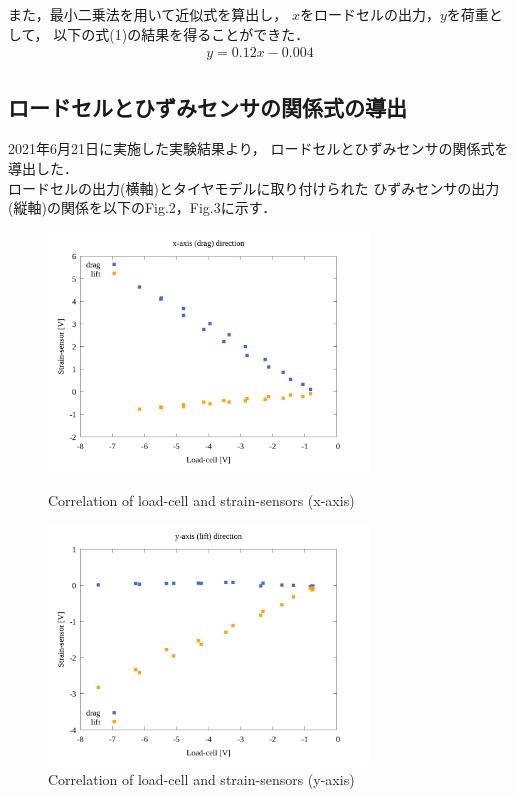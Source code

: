 \documentclass[twocolumn,a4j]{jsarticle}
\begin{document}
また，最小二乗法を用いて近似式を算出し，
$x$をロードセルの出力，$y$を荷重として，
以下の式(1)の結果を得ることができた．
\begin{eqnarray}
    y = 0.12 x - 0.004
\end{eqnarray}

\subsection{ロードセルとひずみセンサの関係式の導出}
2021年6月21日に実施した実験結果より，
ロードセルとひずみセンサの関係式を導出した．\\
ロードセルの出力(横軸)とタイヤモデルに取り付けられた
ひずみセンサの出力(縦軸)の関係を以下のFig.2，Fig.3に示す．
\begin{figure}[htbp]
    \footnotesize
    \begin{center}
        \includegraphics[width=85mm]{../images/05_strainsensor-loadcell_x.png}
        \caption{Correlation of load-cell and strain-sensors (x-axis)}
        \includegraphics[width=85mm]{../images/06_strainsensor-loadcell_y.png}
        \caption{Correlation of load-cell and strain-sensors (y-axis)}
    \end{center}
\end{figure}

\newpage
\end{document}
